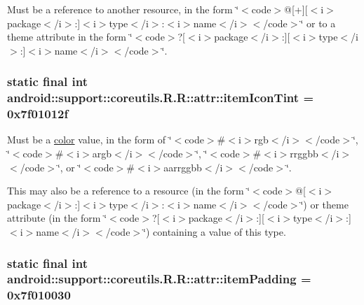 Must be a reference to another resource, in the form \char`\"{}$<$code$>$@\mbox{[}+\mbox{]}\mbox{[}$<$i$>$package$<$/i$>$:\mbox{]}$<$i$>$type$<$/i$>$:$<$i$>$name$<$/i$>$$<$/code$>$\char`\"{} or to a theme attribute in the form \char`\"{}$<$code$>$?\mbox{[}$<$i$>$package$<$/i$>$:\mbox{]}\mbox{[}$<$i$>$type$<$/i$>$:\mbox{]}$<$i$>$name$<$/i$>$$<$/code$>$\char`\"{}. \hypertarget{classandroid_1_1support_1_1coreutils_1_1_r_1_1attr_a741367453212c3205e6ae8794dfc1da}{
\subsubsection[{itemIconTint}]{\setlength{\rightskip}{0pt plus 5cm}static final int android::support::coreutils.R.R::attr::itemIconTint = 0x7f01012f}}
\label{classandroid_1_1support_1_1coreutils_1_1_r_1_1attr_a741367453212c3205e6ae8794dfc1da}


Must be a \hyperlink{classandroid_1_1support_1_1coreutils_1_1_r_1_1color}{color} value, in the form of \char`\"{}$<$code$>$\#$<$i$>$rgb$<$/i$>$$<$/code$>$\char`\"{}, \char`\"{}$<$code$>$\#$<$i$>$argb$<$/i$>$$<$/code$>$\char`\"{}, \char`\"{}$<$code$>$\#$<$i$>$rrggbb$<$/i$>$$<$/code$>$\char`\"{}, or \char`\"{}$<$code$>$\#$<$i$>$aarrggbb$<$/i$>$$<$/code$>$\char`\"{}. 

This may also be a reference to a resource (in the form \char`\"{}$<$code$>$@\mbox{[}$<$i$>$package$<$/i$>$:\mbox{]}$<$i$>$type$<$/i$>$:$<$i$>$name$<$/i$>$$<$/code$>$\char`\"{}) or theme attribute (in the form \char`\"{}$<$code$>$?\mbox{[}$<$i$>$package$<$/i$>$:\mbox{]}\mbox{[}$<$i$>$type$<$/i$>$:\mbox{]}$<$i$>$name$<$/i$>$$<$/code$>$\char`\"{}) containing a value of this type. \hypertarget{classandroid_1_1support_1_1coreutils_1_1_r_1_1attr_4c2408ef52203b02095fa7b863585868}{
\subsubsection[{itemPadding}]{\setlength{\rightskip}{0pt plus 5cm}static final int android::support::coreutils.R.R::attr::itemPadding = 0x7f010030}}
\label{classandroid_1_1support_1_1coreutils_1_1_r_1_1attr_4c2408ef52203b02095fa7b863585868}


